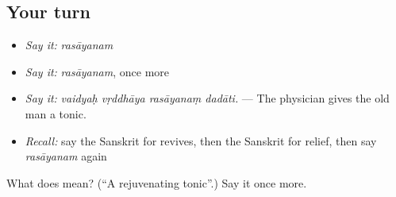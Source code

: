 \subsection*{Your turn}
\begin{itemize}
\raggedright
  \item \emph{Say it:} \emph{rasāyanam}
  \item \emph{Say it:} \emph{rasāyanam}, once more
  \item \emph{Say it:} \emph{vaidyaḥ vṛddhāya rasāyanaṃ dadāti.} — The physician gives the old man a tonic.
  \item \emph{Recall:} say the Sanskrit for revives, then the Sanskrit for relief, then say \emph{rasāyanam} again
\end{itemize}

\begin{tcolorbox}[breakable,colback=teal!4,colframe=teal!35!black,title={Before you move on}]
What does  mean? (\textquotedblleft{}A rejuvenating tonic\textquotedblright{}.) Say it once more.
\end{tcolorbox}

